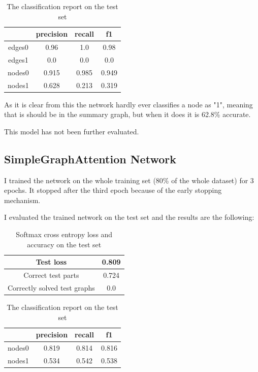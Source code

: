 \begin{table}[!h]
	\centering
	\begin{tabular}{| c | c | c | c |}
		\hline
		 & precision & recall & f1 \\ \hline \hline
		edges0&0.96&1.0&0.98  \\ \hline
		edges1 & 0.0 & 0.0 & 0.0 \\ \hline
		nodes0 & 0.915 & 0.985 & 0.949 \\ \hline
		nodes1 & 0.628 & 0.213 & 0.319 \\ \hline
	\end{tabular}
	\caption{The classification report on the test set}
\end{table}

As it is clear from this the network hardly ever classifies a node as "1", meaning that is should be in the summary graph, but when it does it is 62.8\% accurate.

This model has not been further evaluated.

\subsection{SimpleGraphAttention Network}
I trained the network on the whole training set (80\% of the whole dataset) for 3 epochs. It stopped after the third epoch because of the early stopping mechanism.

I evaluated the trained network on the test set and the results are the following:

\begin{table}[!h]
	\centering
	\begin{tabular}{| c | c |}
		\hline
		Test loss & 0.809 \\ \hline
		Correct test parts & 0.724 \\ \hline
		Correctly solved test graphs & 0.0 \\ \hline
	\end{tabular}
	\caption{Softmax cross entropy loss and accuracy on the test set}
\end{table}

\begin{table}[!h]
	\centering
	\begin{tabular}{| c | c | c | c |}
		\hline
		& precision & recall & f1 \\ \hline \hline
		nodes0 & 0.819 & 0.814 & 0.816 \\ \hline
		nodes1 & 0.534 & 0.542 & 0.538 \\ \hline
	\end{tabular}
	\caption{The classification report on the test set}
\end{table}

